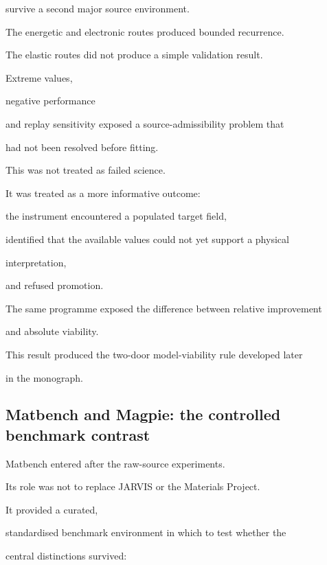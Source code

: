 \documentclass[11pt,a4paper,oneside]{report}
\begin{document}
survive a second major source environment.



The energetic and electronic routes produced bounded recurrence.



The elastic routes did not produce a simple validation result.



Extreme values,

negative performance

and replay sensitivity exposed a source-admissibility problem that

had not been resolved before fitting.



This was not treated as failed science.



It was treated as a more informative outcome:

the instrument encountered a populated target field,

identified that the available values could not yet support a physical

interpretation,

and refused promotion.



The same programme exposed the difference between relative improvement

and absolute viability.



This result produced the two-door model-viability rule developed later

in the monograph.



\subsection{Matbench and Magpie: the controlled benchmark contrast}



Matbench entered after the raw-source experiments.



Its role was not to replace JARVIS or the Materials Project.



It provided a curated,

standardised benchmark environment in which to test whether the

central distinctions survived:
\end{document}
